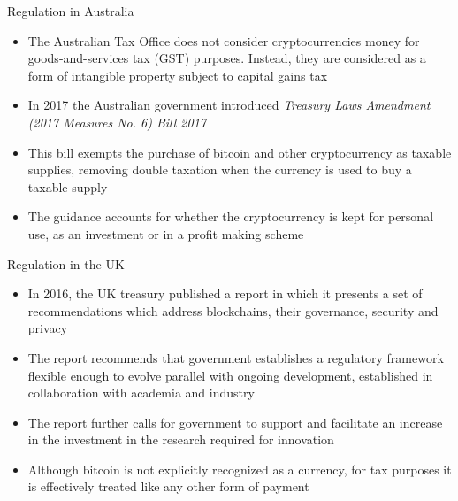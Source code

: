 \documentclass[10pt]{beamer}
\begin{document}
\begin{frame}{Regulation in Australia}
	\begin{itemize}
		\item The Australian Tax Office does not consider cryptocurrencies money for goods-and-services tax (GST) purposes. Instead, they are considered as a form of intangible property subject to capital gains tax
		\item In 2017 the Australian government introduced \textit{Treasury Laws Amendment (2017 Measures No. 6) Bill 2017}
		\item This bill exempts the purchase of bitcoin and other cryptocurrency as taxable supplies, removing double taxation when the currency is used to buy a taxable supply
		\item The guidance accounts for whether the cryptocurrency is kept for personal use, as an investment or in a profit making scheme
	\end{itemize}
\end{frame}


\begin{frame}{Regulation in the UK}
	\begin{itemize}
		\item In 2016, the UK treasury published a report in which it presents a set of recommendations which address blockchains, their governance, security and privacy
		\item The report recommends that government establishes a regulatory framework flexible enough to evolve parallel with ongoing development, established in collaboration with academia and industry
		\item The report further calls for government to support and facilitate an increase in the investment in the research required for innovation
		\item Although bitcoin is not explicitly recognized as a currency, for tax purposes it is effectively treated like any other form of payment
	\end{itemize}
\end{frame}

\end{document}
